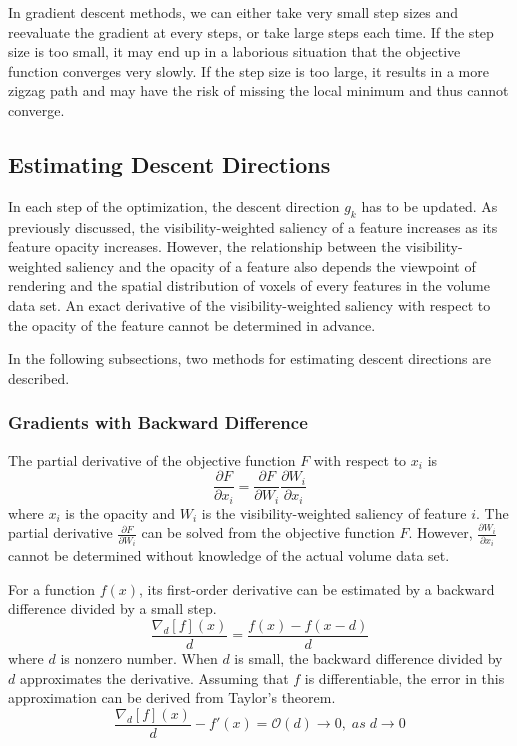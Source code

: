 In gradient descent methods, we can either take very small step sizes and reevaluate the gradient at every steps, or take large steps each time. If the step size is too small, it may end up in a laborious situation that the objective function converges very slowly. If the step size is too large, it results in a more zigzag path and may have the risk of missing the local minimum and thus cannot converge.

\subsection{Estimating Descent Directions \label{estimating_descent_directions}}
In each step of the optimization, the descent direction $ g_{k} $ has to be updated. 
As previously discussed, the visibility-weighted saliency of a feature increases as its feature opacity increases. 
However, the relationship between the visibility-weighted saliency and the opacity of a feature also depends the viewpoint of rendering and the spatial distribution of voxels of every features in the volume data set. An exact derivative of the visibility-weighted saliency with respect to the opacity of the feature cannot be determined in advance.

In the following subsections, two methods for estimating descent directions are described.

\subsubsection{Gradients with Backward Difference}
The partial derivative of the objective function $ F $ with respect to $ x_{i} $ is
\[ \frac{\partial F}{\partial x_{i}} = \frac{\partial F}{\partial W_{i}} \frac{\partial W_{i}}{\partial x_{i}} \]
where $ x_{i} $ is the opacity and $ W_{i} $ is the visibility-weighted saliency of feature $ i $.
The partial derivative $ \frac{\partial F}{\partial W_{i}} $ can be solved from the objective function $ F $.
However, $ \frac{\partial W_{i}}{\partial x_{i}} $ cannot be determined without knowledge of the actual volume data set.

For a function $ f(x) $, its first-order derivative can be estimated by a backward difference divided by a small step.
\[ \frac{\nabla_{d}[f](x)}{d}=\frac{f(x)-f(x-d)}{d} \]
where $ d $ is nonzero number.
When $ d $ is small, the backward difference divided by $ d $ approximates the derivative. Assuming that $ f $ is differentiable, the error in this approximation can be derived from Taylor's theorem.
\[ \frac{\nabla_{d}[f](x)}{d}-f'(x)=\mathcal{O}(d) \to 0 , \; as \; d \to 0 \]

